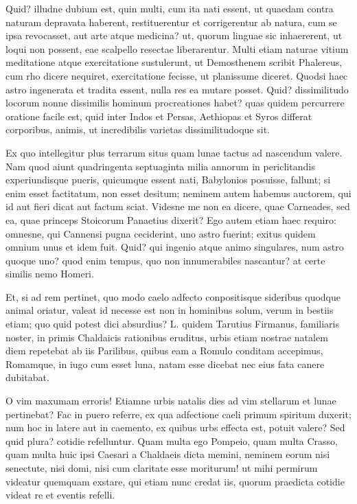  Quid? illudne dubium est, quin multi, cum ita nati essent, ut quaedam contra naturam depravata haberent, restituerentur et corrigerentur ab natura, cum se ipsa revocasset, aut arte atque medicina? ut, quorum linguae sic inhaererent, ut loqui non possent, eae scalpello resectae liberarentur. Multi etiam naturae vitium meditatione atque exercitatione sustulerunt, ut Demosthenem scribit Phalereus, cum rho dicere nequiret, exercitatione fecisse, ut planissume diceret. Quodsi haec astro ingenerata et tradita essent, nulla res ea mutare posset. Quid? dissimilitudo locorum nonne dissimilis hominum procreationes habet? quas quidem percurrere oratione facile est, quid inter Indos et Persas, Aethiopas et Syros differat corporibus, animis, ut incredibilis varietas dissimilitudoque sit.

 Ex quo intellegitur plus terrarum situs quam lunae tactus ad nascendum valere. Nam quod aiunt quadringenta septuaginta milia annorum in periclitandis experiundisque pueris, quicumque essent nati, Babylonios posuisse, fallunt; si enim esset factitatum, non esset desitum; neminem autem habemus auctorem, qui id aut fieri dicat aut factum sciat. Videsne me non ea dicere, quae Carneades, sed ea, quae princeps Stoicorum Panaetius dixerit? Ego autem etiam haec requiro: omnesne, qui Cannensi pugna ceciderint, uno astro fuerint; exitus quidem omnium unus et idem fuit. Quid? qui ingenio atque animo singulares, num astro quoque uno? quod enim tempus, quo non innumerabiles nascantur? at certe similis nemo Homeri.

 Et, si ad rem pertinet, quo modo caelo adfecto conpositisque sideribus quodque animal oriatur, valeat id necesse est non in hominibus solum, verum in bestiis etiam; quo quid potest dici absurdius? L. quidem Tarutius Firmanus, familiaris noster, in primis Chaldaicis rationibus eruditus, urbis etiam nostrae natalem diem repetebat ab iis Parilibus, quibus eam a Romulo conditam accepimus, Romamque, in iugo cum esset luna, natam esse dicebat nec eius fata canere dubitabat.

 O vim maxumam erroris! Etiamne urbis natalis dies ad vim stellarum et lunae pertinebat? Fac in puero referre, ex qua adfectione caeli primum spiritum duxerit; num hoc in latere aut in caemento, ex quibus urbs effecta est, potuit valere? Sed quid plura? cotidie refelluntur. Quam multa ego Pompeio, quam multa Crasso, quam multa huic ipsi Caesari a Chaldaeis dicta memini, neminem eorum nisi senectute, nisi domi, nisi cum claritate esse moriturum! ut mihi permirum videatur quemquam exstare, qui etiam nunc credat iis, quorum praedicta cotidie videat re et eventis refelli.

